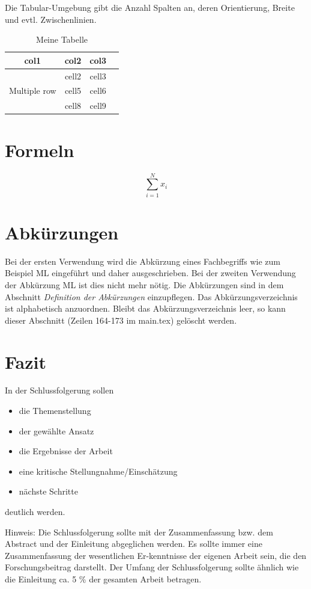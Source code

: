 Die Tabular-Umgebung gibt die Anzahl Spalten an, deren Orientierung, Breite und evtl. Zwischenlinien. 


\begin{table}[ht]
    \centering
    \caption{Meine Tabelle}
    \begin{tabular}{ cccc }
        \toprule
        col1 & col2 & col3 \\
        \midrule
        \multirow{3}{4em}{Multiple row} & cell2 & cell3 \\ 
        & cell5 & cell6 \\ 
        & cell8 & cell9 \\ 
        \bottomrule
    \end{tabular}
    \label{tab:countries}
\end{table}

\section{Formeln}

\begin{equation}
    \sum_{i=1}^N x_i
    \label{eq:1}
\end{equation}

\section{Abkürzungen}
Bei der ersten Verwendung wird die Abkürzung eines Fachbegriffs wie zum Beispiel \ac{ML} eingeführt und daher ausgeschrieben. Bei der zweiten Verwendung der Abkürzung \ac{ML} ist dies nicht mehr nötig. Die Abkürzungen sind in dem Abschnitt \textit{Definition der Abkürzungen} einzupflegen. Das Abkürzungsverzeichnis ist alphabetisch anzuordnen. Bleibt das Abkürzungsverzeichnis leer, so kann dieser Abschnitt (Zeilen 164-173 im main.tex) gelöscht werden.


\section{Fazit}
In der Schlussfolgerung sollen

\begin{itemize}
\item die Themenstellung
\item der gewählte Ansatz
\item die Ergebnisse der Arbeit
\item eine kritische Stellungnahme/Einschätzung
\item nächste Schritte
\end{itemize}
deutlich werden.

Hinweis:
Die Schlussfolgerung sollte mit der Zusammenfassung bzw. dem Abstract und der Einleitung abgeglichen werden. Es sollte immer eine Zusammenfassung der wesentlichen Er-kenntnisse der eigenen Arbeit sein, die den Forschungsbeitrag darstellt. Der Umfang der Schlussfolgerung sollte ähnlich wie die Einleitung ca. 5 \% der gesamten Arbeit betragen.

